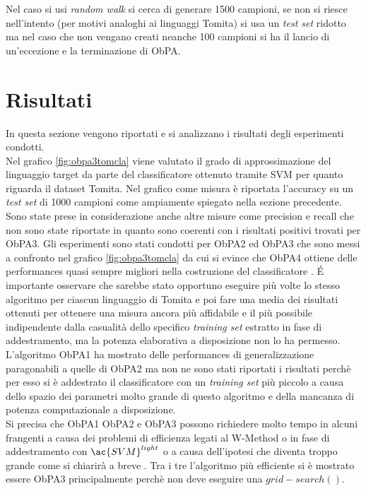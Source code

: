 Nel caso si usi \textit{random walk} si cerca di generare 1500 campioni, se non si riesce nell'intento (per motivi analoghi ai linguaggi Tomita) si usa un \textit{test set} ridotto ma nel caso che non vengano creati neanche 100 campioni si ha il lancio di un'eccezione e la terminazione di \ac{ObPA}.

\section{Risultati}
In questa sezione vengono riportati e si analizzano i risultati degli esperimenti condotti. \\
Nel grafico \ref{fig:obpa3tomcla} viene valutato il grado di approssimazione del linguaggio target da parte del classificatore ottenuto tramite \ac{SVM} per quanto riguarda il dataset Tomita. Nel grafico come misura è riportata l'accuracy su un \textit{test set} di 1000 campioni come ampiamente spiegato nella sezione precedente. Sono state prese in considerazione anche altre misure come precision e recall che non sono state riportate in quanto sono coerenti con i risultati positivi trovati per \ac{ObPA}3. Gli esperimenti sono stati condotti per \ac{ObPA}2 ed \ac{ObPA}3 che sono messi a confronto nel grafico \ref{fig:obpa3tomcla} da cui si evince che \ac{ObPA}4 ottiene delle performances quasi sempre migliori nella costruzione del classificatore . \'E importante osservare che sarebbe stato opportuno eseguire più volte lo stesso algoritmo per ciascun linguaggio di Tomita e poi fare una media dei risultati ottenuti per ottenere una misura ancora più affidabile e il più possibile indipendente dalla casualità dello specifico \textit{training set} estratto in fase di addestramento, ma la potenza elaborativa a disposizione non lo ha permesso. \\
L'algoritmo \ac{ObPA}1 ha mostrato delle performances di generalizzazione paragonabili a quelle di \ac{ObPA}2 ma non ne sono stati riportati i risultati perchè per esso si è addestrato il classificatore con un \textit{training set} più piccolo a causa dello spazio dei parametri molto grande di questo algoritmo e della mancanza di potenza computazionale a disposizione.\\ Si precisa che \ac{ObPA}1 \ac{ObPA}2 e \ac{ObPA}3 possono richiedere molto tempo in alcuni frangenti a causa dei problemi di efficienza legati al W-Method o in fase di addestramento con $\ac{SVM}^{light}$ o a causa dell'ipotesi che diventa troppo grande come si chiarirà a breve . Tra i tre l'algoritmo più efficiente si è mostrato essere \ac{ObPA}3 principalmente perchè non deve eseguire una $grid-search()$.\\

